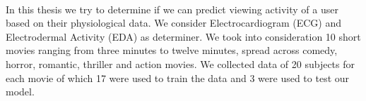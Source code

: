 \paragraph{}
In this thesis we try to determine if we can predict viewing activity of a user based on their physiological data. We consider Electrocardiogram (ECG) and Electrodermal Activity (EDA) as determiner. We took into consideration 10 short movies ranging from three minutes to twelve minutes, spread across comedy, horror, romantic, thriller and action movies. We collected data of 20 subjects for each movie of which 17 were used to train the data and 3 were used to test our model. 